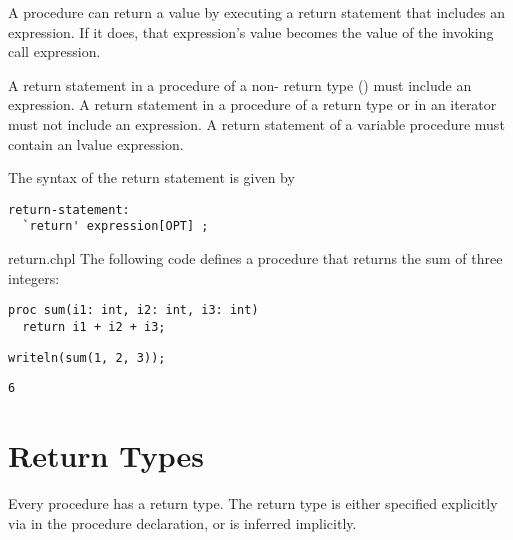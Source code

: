 A procedure can return a value by executing a return statement
that includes an expression. If it does, that expression's value
becomes the value of the invoking call expression.

A return statement in a procedure of a non- return type
() must include an expression.
A return statement in a procedure of a  return type
or in an iterator must not include an expression.
A return statement of a variable procedure must contain an lvalue expression.


The syntax of the return statement is given by
\begin{syntax}
\begin{verbatim}
return-statement:
  `return' expression[OPT] ;
\end{verbatim}
\end{syntax}

\begin{chapelexample}{return.chpl}
The following code defines a procedure that returns the sum of three
integers:
\begin{chapel}
\begin{verbatim}
proc sum(i1: int, i2: int, i3: int)
  return i1 + i2 + i3;
\end{verbatim}
\end{chapel}
\begin{chapelpost}
\begin{verbatim}
writeln(sum(1, 2, 3));
\end{verbatim}
\end{chapelpost}
\begin{chapeloutput}
\begin{verbatim}
6
\end{verbatim}
\end{chapeloutput}
\end{chapelexample}


\section{Return Types}
\label{Return_Types}

Every procedure has a return type. The return type is either
specified explicitly via  in the procedure
declaration, or is inferred implicitly.

